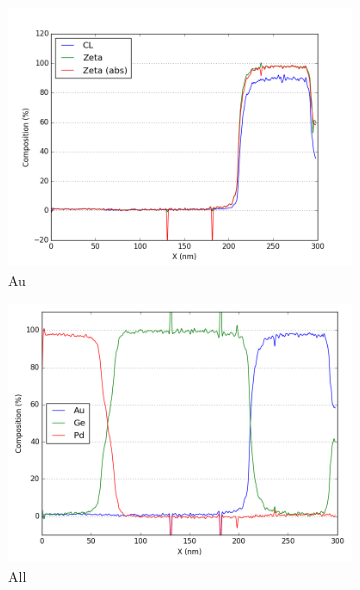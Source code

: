 \begin{figure}
\begin{subfigure}{.5\textwidth}
		\includegraphics[width=\linewidth]{fig/q/2_Au2}
		\caption{Au}
		\label{fig:zeta_area2_au}
	\end{subfigure}%
	\begin{subfigure}{.5\textwidth}
		\centering
		\includegraphics[width=\linewidth]{fig/q/2_all_abscorr2}
		\caption{All}
		\label{fig:zeta_area2_all}
	\end{subfigure}
		\centering
	\begin{subfigure}{.5\textwidth}

\end{subfigure}
\end{figure}
